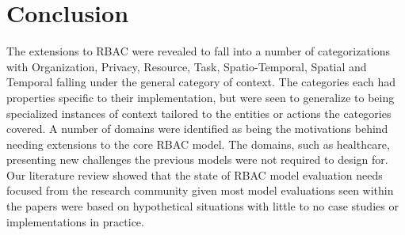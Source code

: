 \section{Conclusion} \label{sec:conclusion}

The extensions to RBAC were revealed to fall into a number of categorizations with Organization, Privacy, Resource, Task, Spatio-Temporal, Spatial and Temporal falling under the general category of context.
The categories each had properties specific to their implementation, but were seen to generalize to being specialized instances of context tailored to the entities or actions the categories covered.
A number of domains were identified as being the motivations behind needing extensions to the core RBAC model.  The domains, such as healthcare, presenting new challenges the previous models were not
required to design for.  Our literature review showed that the state of RBAC model evaluation needs focused from the research community given most model evaluations seen within the papers were
based on hypothetical situations with little to no case studies or implementations in practice.
